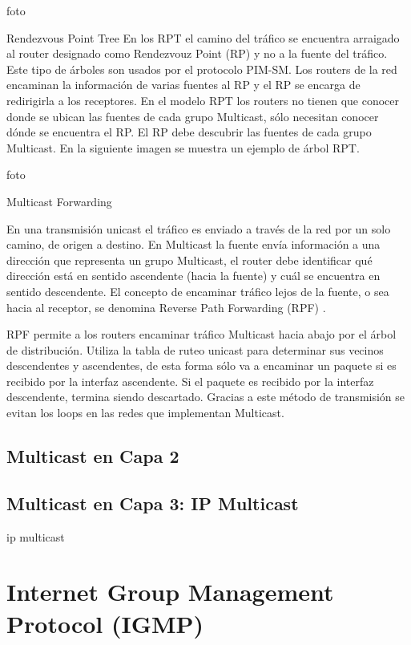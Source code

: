 \documentclass[12pt,a4paper,oneside]{book}
\begin{document}
foto

Rendezvous Point Tree	
	En los RPT el camino del tráfico se encuentra arraigado al router designado como Rendezvouz Point (RP) y no a la fuente del tráfico. Este tipo de árboles son usados por el protocolo PIM-SM. Los routers de la red encaminan la información de varias fuentes al RP y el RP se encarga de redirigirla a los receptores. En el modelo RPT los routers no tienen que conocer donde se ubican las fuentes de cada grupo Multicast, sólo necesitan conocer dónde se encuentra el RP. El RP debe descubrir las fuentes de cada grupo Multicast. En la siguiente imagen se muestra un ejemplo de árbol RPT.

foto

Multicast Forwarding 

En una transmisión unicast el tráfico es enviado a través de la red por un solo camino, de origen a destino. En Multicast la fuente envía información a una dirección que representa un grupo Multicast, el router debe identificar qué dirección está en sentido ascendente (hacia la fuente) y cuál se encuentra en sentido descendente. El concepto de encaminar tráfico lejos de la fuente, o sea hacia al receptor, se denomina Reverse Path Forwarding (RPF) .

	RPF permite a los routers encaminar tráfico Multicast hacia abajo por el árbol de distribución. Utiliza la tabla de ruteo unicast para determinar sus vecinos descendentes y ascendentes, de esta forma sólo va a encaminar un paquete si es recibido por la interfaz ascendente. Si el paquete es recibido por la interfaz descendente, termina siendo descartado. Gracias a este método de transmisión se evitan los loops en las redes que implementan Multicast.






\subsection{Multicast en Capa 2}



\subsection{Multicast en Capa 3: IP Multicast}

ip multicast


\section{Internet Group Management Protocol (IGMP)}
\end{document}
